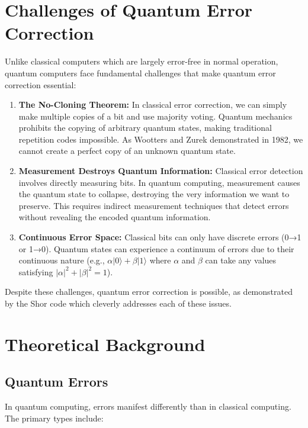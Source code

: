 \documentclass[12pt,a4paper]{article}
\begin{document}
\section{Challenges of Quantum Error Correction}

Unlike classical computers which are largely error-free in normal operation, quantum computers face fundamental challenges that make quantum error correction essential:

\begin{enumerate}
    \item \textbf{The No-Cloning Theorem:} In classical error correction, we can simply make multiple copies of a bit and use majority voting. Quantum mechanics prohibits the copying of arbitrary quantum states, making traditional repetition codes impossible. As Wootters and Zurek demonstrated in 1982, we cannot create a perfect copy of an unknown quantum state.
    
    \item \textbf{Measurement Destroys Quantum Information:} Classical error detection involves directly measuring bits. In quantum computing, measurement causes the quantum state to collapse, destroying the very information we want to preserve. This requires indirect measurement techniques that detect errors without revealing the encoded quantum information.
    
    \item \textbf{Continuous Error Space:} Classical bits can only have discrete errors (0→1 or 1→0). Quantum states can experience a continuum of errors due to their continuous nature (e.g., $\alpha |0\rangle + \beta |1\rangle$ where $\alpha$ and $\beta$ can take any values satisfying $|\alpha|^2 + |\beta|^2 = 1$).
\end{enumerate}

Despite these challenges, quantum error correction is possible, as demonstrated by the Shor code which cleverly addresses each of these issues.



\section{Theoretical Background}

\subsection{Quantum Errors}

In quantum computing, errors manifest differently than in classical computing. The primary types include:
\end{document}
